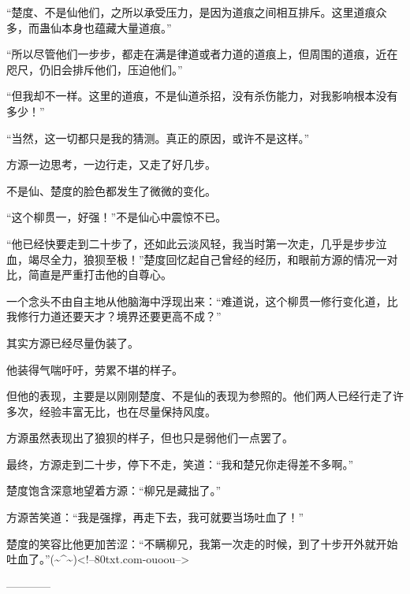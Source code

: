 \begin{this_body}
“楚度、不是仙他们，之所以承受压力，是因为道痕之间相互排斥。这里道痕众多，而蛊仙本身也蕴藏大量道痕。”

“所以尽管他们一步步，都走在满是律道或者力道的道痕上，但周围的道痕，近在咫尺，仍旧会排斥他们，压迫他们。”

“但我却不一样。这里的道痕，不是仙道杀招，没有杀伤能力，对我影响根本没有多少！”

“当然，这一切都只是我的猜测。真正的原因，或许不是这样。”

方源一边思考，一边行走，又走了好几步。

不是仙、楚度的脸色都发生了微微的变化。

“这个柳贯一，好强！”不是仙心中震惊不已。

“他已经快要走到二十步了，还如此云淡风轻，我当时第一次走，几乎是步步泣血，竭尽全力，狼狈至极！”楚度回忆起自己曾经的经历，和眼前方源的情况一对比，简直是严重打击他的自尊心。

一个念头不由自主地从他脑海中浮现出来：“难道说，这个柳贯一修行变化道，比我修行力道还要天才？境界还要更高不成？”

其实方源已经尽量伪装了。

他装得气喘吁吁，劳累不堪的样子。

但他的表现，主要是以刚刚楚度、不是仙的表现为参照的。他们两人已经行走了许多次，经验丰富无比，也在尽量保持风度。

方源虽然表现出了狼狈的样子，但也只是弱他们一点罢了。

最终，方源走到二十步，停下不走，笑道：“我和楚兄你走得差不多啊。”

楚度饱含深意地望着方源：“柳兄是藏拙了。”

方源苦笑道：“我是强撑，再走下去，我可就要当场吐血了！”

楚度的笑容比他更加苦涩：“不瞒柳兄，我第一次走的时候，到了十步开外就开始吐血了。”(\~{}\^{}\~{})<!--80txt.com-ouoou-->

------------

\end{this_body}

